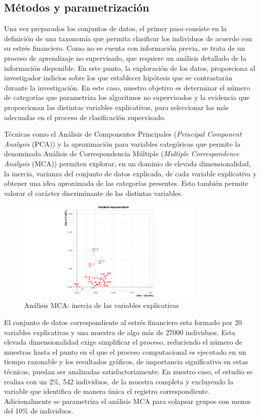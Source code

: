 \documentclass[a4paper, 11pt]{article}
\begin{document}
\subsection{Métodos y parametrización}
\label{sec:sub:clustering}
Una vez preparados los conjuntos de datos, el primer paso consiste en la definición de
una taxonomía que permita clasificar los individuos de acuerdo con su estrés financiero.
Como no se cuenta con información previa, se trata de un proceso de aprendizaje no supervisado,
que requiere un análisis detallado de la información disponible. En este punto, la exploración
de los datos, proporciona al investigador indicios sobre los que establecer hipótesis que
se contrastarán durante la investigación. En este caso, nuestro objetivo es determinar el
número de categorías que parametriza los algoritmos no supervisados y la evidencia que 
proporcionan las distintas variables explicativas, para seleccionar las más adecuadas en el
proceso de clasificación supervisado.

Técnicas como el Análisis de Componentes Principales (\textit{Principal Component
Analysis} (PCA)) y la aproximación para variables categóricas que permite la denominada
Análisis de Correspondencia Múltiple (\textit{Multiple Correspondence  Analysis}
(MCA))\cite{Husson20} permiten explorar, en un dominio de elevada dimensionalidad, la 
inercia, varianza del conjunto de datos explicada, de cada variable explicativa y 
obtener una idea aproximada de las categorías presentes. Esto también permite valorar el 
carácter discriminante de las distintas variables.

\begin{figure}[ht]
    \centering
    \includegraphics[width=0.8\textwidth]{images/mca_stress_features_inertia.pdf} 
    \caption{Análisis MCA: inercia de las variables explicativas}
    \label{fig:mca_stress_features_inertia}
\end{figure}

El conjunto de datos correspondiente al estrés financiero esta formado por 20 variables 
explicativas y una muestra de algo más de 27000 individuos. Esta elevada dimensionalidad
exige simplificar el proceso, reduciendo el número de muestras hasta el punto en el que 
el proceso computacional es ejecutado en un tiempo razonable y los resultados gráficos, de
importancia significativa en estas técnicas, puedan ser analizadas satisfactoriamente. En 
nuestro caso, el estudio se realiza con un 2\%, 542 individuos, de la muestra completa y 
excluyendo la variable que identifica de manera única el registro correspondiente. 
Adicionalmente se parametriza el análisis MCA para colapsar grupos con menos del 10\% de
individuos. 
\end{document}
